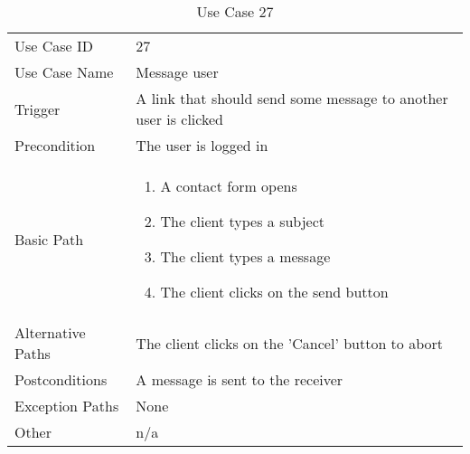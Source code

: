 \begin{table}[H]
\centering
\label{table-use-case-27}
\begin{tabular}{|p{3cm}|p{10cm}}
Use Case ID       & 27                                                           
\\
Use Case Name     & Message user                                                        
\\
Trigger           & A link that should send some message to another user is
clicked
\\
Precondition      & The user is logged in                                                
\\
Basic Path        & \begin{enumerate}
\item A contact form opens
\item The client types a subject
\item The client types a message
\item The client clicks on the send button
\end{enumerate} 
     \\
Alternative Paths & The client clicks on the 'Cancel' button to abort                        
\\
Postconditions    & A message is sent to the receiver
\\
Exception Paths   & None                          \\
Other             & n/a                                                                                                                                                                                                        
\end{tabular}
\caption{Use Case 27}
\end{table}

